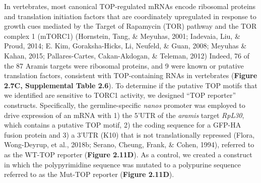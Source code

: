 \documentclass[12pt,oneside]{reedthesis}
\begin{document}
In vertebrates, most canonical TOP-regulated mRNAs encode ribosomal proteins and translation initiation factors that are coordinately upregulated in response to growth cues mediated by the Target of Rapamycin (TOR) pathway and the TOR complex 1 (mTORC1) (Hornstein, Tang, \& Meyuhas, 2001; Iadevaia, Liu, \& Proud, 2014; E. Kim, Goraksha-Hicks, Li, Neufeld, \& Guan, 2008; Meyuhas \& Kahan, 2015; Pallares-Cartes, Cakan-Akdogan, \& Teleman, 2012) Indeed, 76 of the 87 Aramis targets were ribosomal proteins, and 9 were known or putative translation factors, consistent with TOP-containing RNAs in vertebrates (\textbf{Figure 2.7C, Supplemental Table 2.6}). To determine if the putative TOP motifs that we identified are sensitive to TORC1 activity, we designed ``TOP reporter'' constructs. Specifically, the germline-specific \emph{nanos} promoter was employed to drive expression of an mRNA with 1) the 5'UTR of the \emph{aramis} target \emph{RpL30}, which contains a putative TOP motif, 2) the coding sequence for a GFP-HA fusion protein and 3) a 3'UTR (K10) that is not translationally repressed (Flora, Wong-Deyrup, et al., 2018b; Serano, Cheung, Frank, \& Cohen, 1994), referred to as the WT-TOP reporter (\textbf{Figure 2.11D}). As a control, we created a construct in which the polypyrimidine sequence was mutated to a polypurine sequence referred to as the Mut-TOP reporter (\textbf{Figure 2.11D}).
\end{document}
